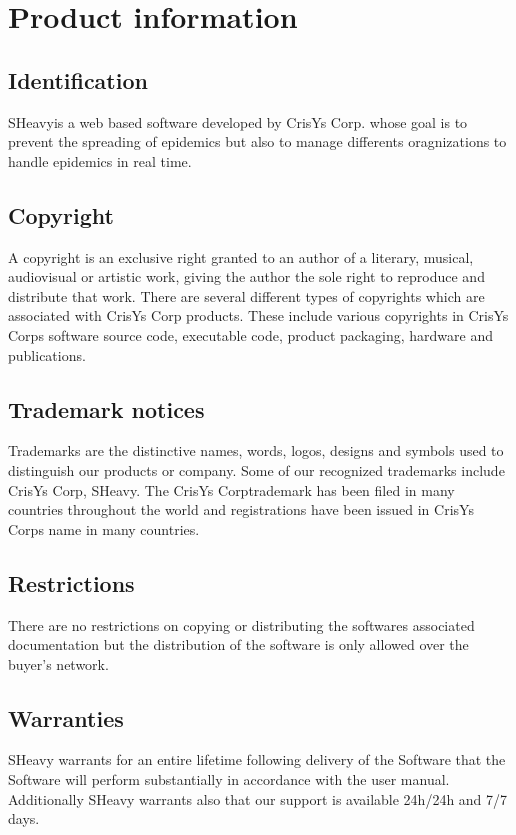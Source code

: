 \chapter{Product information}
\vspace{-6em}

\section{Identification}
SHeavy\textregistered is a web based software developed by CrisYs Corp. whose goal is to
prevent the spreading of epidemics but also to manage differents oragnizations to handle epidemics
in real time.

\section{Copyright}
A copyright is an exclusive right granted to an author of a literary, musical,
audiovisual or artistic work, giving the author the sole right to reproduce and distribute that work. 
There are several different types of copyrights which are associated with CrisYs
Corp products. These include various copyrights in CrisYs Corp\textquotesingle s
software source code, executable code, product packaging, hardware and publications.

\section{Trademark notices}
Trademarks are the distinctive names, words, logos, designs and symbols used to distinguish our
products or company. Some of our recognized trademarks include CrisYs
Corp\textregistered, SHeavy\textregistered. The CrisYs Corp\textregistered trademark has been filed
in many countries throughout the world and registrations have been issued in
CrisYs Corp\textquotesingle s name in many countries.

\section{Restrictions}
There are no restrictions on copying or distributing the
software\textquotesingle s associated documentation but the distribution of the software is only allowed over the
buyer's network.

\section{Warranties}
SHeavy warrants for an entire lifetime following delivery of the Software that
the Software will perform substantially in accordance with the user manual.
Additionally SHeavy warrants also that our support is available 24h/24h and
7/7 days.

